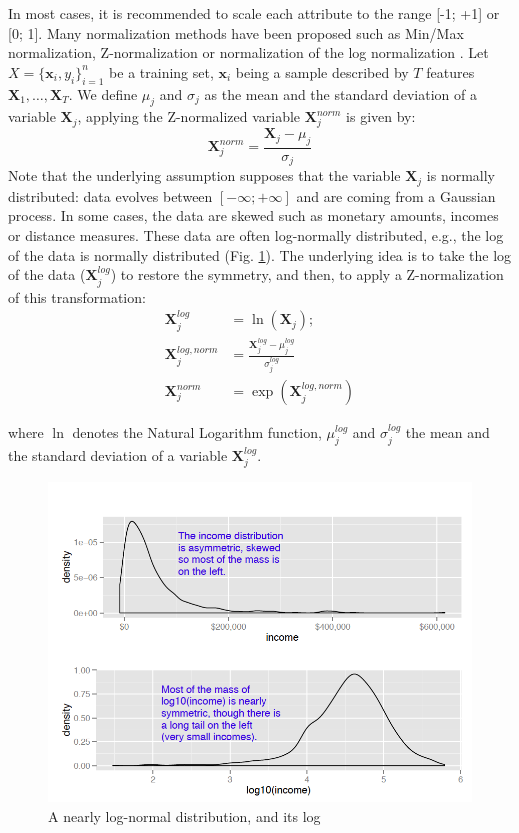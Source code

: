 In most cases, it is recommended to scale each attribute to the range [-1; +1] or [0; 1]. Many normalization methods have been proposed such as Min/Max normalization, Z-normalization or normalization of the log normalization . Let $X=\{\textbf{x}_i,y_i\}_{i=1}^n$ be a training set, $\textbf{x}_i$ being a sample described by $T$ features $\textbf{X}_1, \ldots, \textbf{X}_T$. We define $\mu_j$ and $\sigma_j$ as the mean and the standard deviation of a variable $\textbf{X}_j$, applying the Z-normalized variable $\textbf{X}^{norm}_j$ is given by:
\begin{equation}
\textbf{X}^{norm}_j = \frac{\textbf{X}_j-\mu_j}{\sigma_j}
\end{equation}
Note that the underlying assumption supposes that the variable $\textbf{X}_j$ is normally distributed: data evolves between $[-\infty;+\infty]$ and are coming from a Gaussian process. In some cases, the data are skewed such as monetary amounts, incomes or distance measures. These data are often log-normally distributed, e.g., the log of the data is normally distributed (Fig. \ref{fig:SkewedData}). The underlying idea is to take the log of the data ($\textbf{X}^{log}_j$) to restore the symmetry, and then, to apply a Z-normalization of this transformation:
\begin{align}
\textbf{X}^{log}_j 		& = \ln(\textbf{X}_j); \\
\textbf{X}^{log,norm}_j & = \frac{\textbf{X}^{log}_j-\mu^{log}_j}{\sigma^{log}_j} \\
\textbf{X}^{norm}_j 	& = \exp(\textbf{X}^{log,norm}_j)
\end{align}

\noindent where $\ln$ denotes the Natural Logarithm function, $\mu^{log}_j$ and $\sigma^{log}_j$ the mean and the standard deviation of a variable $\textbf{X}^{log}_j$.

\begin{figure}
	\centering
	\includegraphics[width=0.6\linewidth]{images/SkewedData}
	\caption{A nearly log-normal distribution, and its log \protect\footnotemark}
	\label{fig:SkewedData}
\end{figure}


